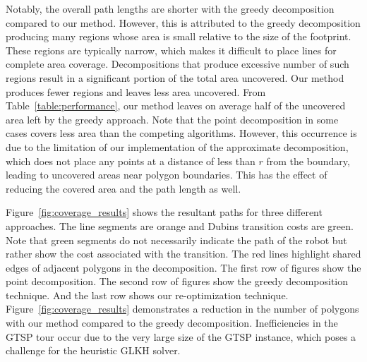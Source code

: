 \documentclass[../main.tex]{subfiles}
\begin{document}
Notably, the overall path lengths are shorter with the greedy decomposition compared to our method. However, this is attributed to the greedy decomposition producing many regions whose area is small relative to the size of the footprint. These regions are typically narrow, which makes it difficult to place lines for complete area coverage. Decompositions that produce excessive number of such regions result in a significant portion of the total area uncovered. Our method produces fewer regions and leaves less area uncovered. From Table~\ref{table:performance}, our method leaves on average half of the uncovered area left by the greedy approach. Note that the point decomposition in some cases covers less area than the competing algorithms. However, this occurrence is due to the limitation of our implementation of the approximate decomposition, which does not place any points at a distance of less than $r$ from the boundary, leading to uncovered areas near polygon boundaries. This has the effect of reducing the covered area and the path length as well.

Figure~\ref{fig:coverage_results} shows the resultant paths for three different approaches. The line segments are orange and Dubins transition costs are green. Note that green segments do not necessarily indicate the path of the robot but rather show the cost associated with the transition. The red lines highlight shared edges of adjacent polygons in the decomposition. The first row of figures show the point decomposition. The second row of figures show the greedy decomposition technique. And the last row shows our re-optimization technique. Figure~\ref{fig:coverage_results} demonstrates a reduction in the number of polygons with our method compared to the greedy decomposition. Inefficiencies in the GTSP tour occur due to the very large size of the GTSP instance, which poses a challenge for the heuristic GLKH solver.
\end{document}
